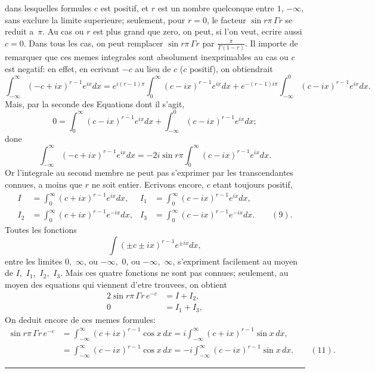 \documentclass[11pt,a4paper]{article}
\begin{document}
\newpage
dans lesquelles formules $c$ est positif, et $r$ est un nombre quelconque entre $1$, $-\infty$, sans exclure la limite superieure; seulement, pour $r=0$, le facteur $\sin r\pi \, \Gamma r$ se reduit a~$\pi$. Au cas ou $r$ est plus grand que zero, on peut, si l'on veut, ecrire aussi $c=0$. Dans tous les cas, on peut remplacer $\sin r\pi \, \Gamma r$ par $\frac{\pi}{\Gamma(1-r)}$. Il importe de remarquer que ces memes integrales sont absolument inexprimables au cas ou $c$ est negatif: en effet, en ecrivant $-c$ au lieu de $c$ ($c$ positif), on obtiendrait
\[
\int_{-\infty}^{\infty} (-c+ix)^{r-1} e^{ix} dx = e^{i(r-1)\pi} \int_0^{\infty} (c-ix)^{r-1} e^{ix} dx + e^{-(r-1)i\pi} \int_{-\infty}^{0} (c-ix)^{r-1} e^{ix} dx.
\]
Mais, par la seconde des Equations dont il s'agit,
\[
0 = \int_0^{\infty} (c-ix)^{r-1} e^{ix} dx + \int_{-\infty}^{0} (c-ix)^{r-1} e^{ix} dx;
\]
done
\[
\int_{-\infty}^{\infty} (-c+ix)^{r-1} e^{ix} dx = -2i\sin r\pi \int_0^{\infty} (c-ix)^{r-1} e^{ix} dx.
\]
Or l'integrale au second membre ne peut pas s'exprimer par les transcendantes connues, a moins que $r$ ne soit entier. Ecrivons encore, $c$ etant toujours positif,
\begin{align*}
I &= \int_0^{\infty} (c+ix)^{r-1} e^{ix} dx, &
I_1 &= \int_0^{\infty} (c-ix)^{r-1} e^{ix} dx,\\
I_2 &= \int_0^{\infty} (c+ix)^{r-1} e^{-ix} dx, &
I_3 &= \int_0^{\infty} (c-ix)^{r-1} e^{-ix} dx. \qquad(9).
\end{align*}
Toutes les fonctions
\[
\int (\pm c \pm ix)^{r-1} e^{\pm ix} dx,
\]
entre les limites $0$,~$\infty$, ou $-\infty$,~$0$, ou $-\infty$,~$\infty$, s'expriment facilement au moyen de $I$,~$I_1$,~$I_2$,~$I_3$. Mais ces quatre fonctions ne sont pas connues; seulement, au moyen des equations qui viennent d'etre trouvees, on obtient
\begin{align*}
2\sin r\pi \, \Gamma r \, e^{-c} &= I + I_2,\\
0 &= I_1 + I_3,
\end{align*}
On deduit encore de ces memes formules:
\begin{align*}
\sin r\pi \, \Gamma r \, e^{-c} &= \int_{-\infty}^{\infty} (c+ix)^{r-1} \cos x\, dx = i\int_{-\infty}^{\infty} (c+ix)^{r-1} \sin x\, dx,\\
&= \int_{-\infty}^{\infty} (c-ix)^{r-1} \cos x\, dx = -i\int_{-\infty}^{\infty} (c-ix)^{r-1} \sin x\, dx. \qquad(11).
\end{align*}

\vspace{20pt}
\begin{center}
\rule{0.5\textwidth}{0.4pt}
\end{center}
\end{document}
